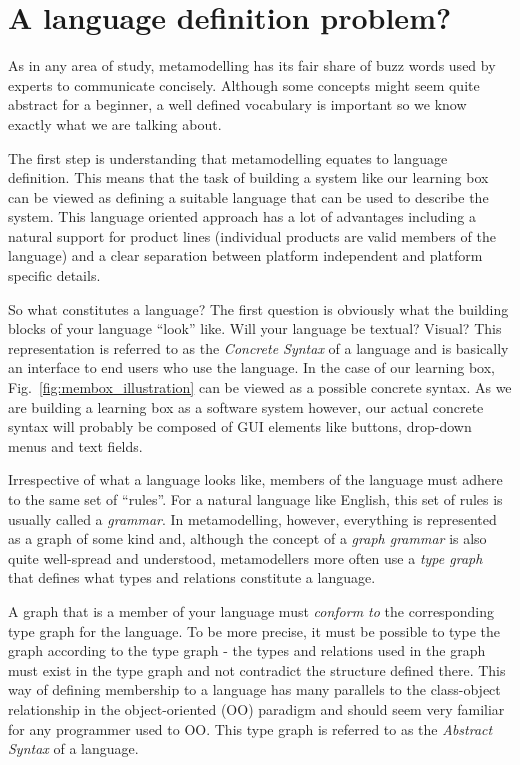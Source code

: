 
\section{A language definition problem?}

As in any area of study, metamodelling has its fair share of buzz words used by experts to communicate concisely.  Although some concepts might seem quite
abstract for a beginner, a well defined vocabulary is important so we know exactly what we are talking about.

The first step is understanding that metamodelling equates to language definition. This means that the task of building a system like our learning box can be  
viewed as defining a suitable language that can be used to describe the system.
This language oriented approach has a lot of advantages including a natural support for product lines (individual products are valid members of the language)
and a clear separation between platform independent and platform specific details.

So what constitutes a language?  The first question is obviously what the building blocks of your language ``look'' like. Will your language be textual? Visual?
 This representation is referred to as the \emph{Concrete Syntax} of a language and is basically an interface to end users who use the
language. In the case of our learning box, Fig.~\ref{fig:membox_illustration} can be viewed as a possible concrete syntax. As we are building a learning box
as a software system however, our actual concrete syntax  will probably be composed of GUI elements like buttons, drop-down menus and text fields.

Irrespective of what a language looks like, members of the language must adhere to the same set of ``rules''. For a natural language like
English, this set of rules is usually called a \emph{grammar}. In metamodelling, however, everything is represented as a graph of some kind and,
although the concept of a  \emph{graph grammar} is also quite well-spread and understood, metamodellers  more often use a \emph{type
graph} that defines what types and relations  constitute a language.

A graph that is a member of your language must \emph{conform to} the corresponding type graph for the language. To be more precise, it must be possible to type
the graph according to the type graph - the types and relations used in the graph must exist in the type graph and not contradict the structure defined there.
This way of defining membership to a language has many parallels to the class-object relationship in the object-oriented (OO) paradigm and
should seem very familiar for any programmer used to OO. This type graph is referred to as the \emph{Abstract Syntax} of a language.

